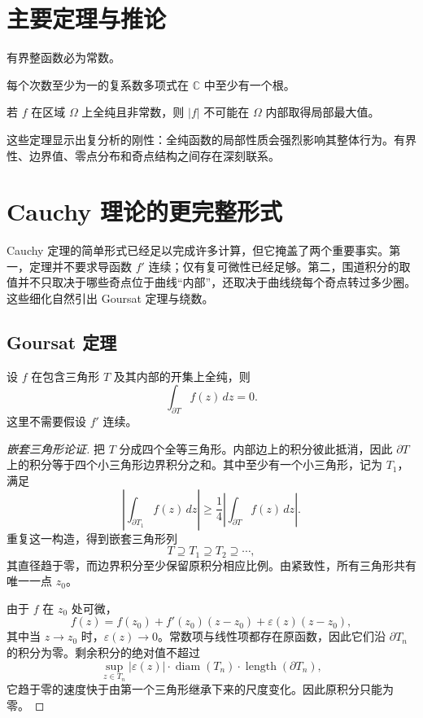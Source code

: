\section{主要定理与推论}

\begin{theorem}[Liouville 定理]
有界整函数必为常数。
\end{theorem}

\begin{theorem}[代数基本定理]
每个次数至少为一的复系数多项式在 $\mathbb{C}$ 中至少有一个根。
\end{theorem}

\begin{theorem}[最大模原理]
若 $f$ 在区域 $\Omega$ 上全纯且非常数，则 $|f|$ 不可能在 $\Omega$ 内部取得局部最大值。
\end{theorem}

\begin{remark}
这些定理显示出复分析的刚性：全纯函数的局部性质会强烈影响其整体行为。有界性、边界值、零点分布和奇点结构之间存在深刻联系。
\end{remark}

\section{Cauchy 理论的更完整形式}

Cauchy 定理的简单形式已经足以完成许多计算，但它掩盖了两个重要事实。第一，定理并不要求导函数 $f'$ 连续；仅有复可微性已经足够。第二，围道积分的取值并不只取决于哪些奇点位于曲线“内部”，还取决于曲线绕每个奇点转过多少圈。这些细化自然引出 Goursat 定理与绕数。

\subsection{Goursat 定理}

\begin{theorem}
设 $f$ 在包含三角形 $T$ 及其内部的开集上全纯，则
\[
    \int_{\partial T} f(z)\,dz=0.
\]
这里不需要假设 $f'$ 连续。
\end{theorem}

\begin{proof}[嵌套三角形论证]
把 $T$ 分成四个全等三角形。内部边上的积分彼此抵消，因此 $\partial T$ 上的积分等于四个小三角形边界积分之和。其中至少有一个小三角形，记为 $T_1$，满足
\[
    \left|\int_{\partial T_1}f(z)\,dz\right|
    \geq \frac14\left|\int_{\partial T}f(z)\,dz\right|.
\]
重复这一构造，得到嵌套三角形列
\[
    T\supseteq T_1\supseteq T_2\supseteq\cdots,
\]
其直径趋于零，而边界积分至少保留原积分相应比例。由紧致性，所有三角形共有唯一一点 $z_0$。

由于 $f$ 在 $z_0$ 处可微，
\[
    f(z)=f(z_0)+f'(z_0)(z-z_0)+\varepsilon(z)(z-z_0),
\]
其中当 $z\to z_0$ 时，$\varepsilon(z)\to0$。常数项与线性项都存在原函数，因此它们沿 $\partial T_n$ 的积分为零。剩余积分的绝对值不超过
\[
    \sup_{z\in T_n}|\varepsilon(z)|\cdot
    \operatorname{diam}(T_n)\cdot\operatorname{length}(\partial T_n),
\]
它趋于零的速度快于由第一个三角形继承下来的尺度变化。因此原积分只能为零。
\end{proof}

